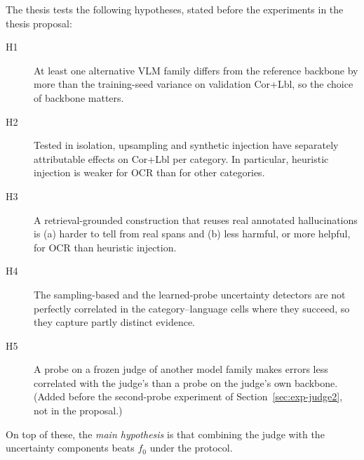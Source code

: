 The thesis tests the following hypotheses, stated before the experiments in the thesis proposal:
\begin{description}
    \item[H1] At least one alternative VLM family differs from the reference backbone by more than the training-seed variance on validation Cor+Lbl, so the choice of backbone matters.
    \item[H2] Tested in isolation, upsampling and synthetic injection have separately attributable effects on Cor+Lbl per category. In particular, heuristic injection is weaker for OCR than for other categories.
    \item[H3] A retrieval-grounded construction that reuses real annotated hallucinations is (a) harder to tell from real spans and (b) less harmful, or more helpful, for OCR than heuristic injection.
    \item[H4] The sampling-based and the learned-probe uncertainty detectors are not perfectly correlated in the category--language cells where they succeed, so they capture partly distinct evidence.
    \item[H5] A probe on a frozen judge of another model family makes errors less correlated with the judge's than a probe on the judge's own backbone. (Added before the second-probe experiment of Section~\ref{sec:exp-judge2}, not in the proposal.)
\end{description}
On top of these, the \emph{main hypothesis} is that combining the judge with the uncertainty components beats $f_0$ under the protocol.

